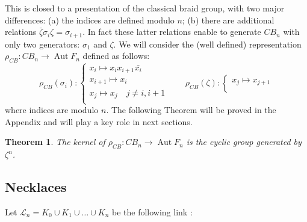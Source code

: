 \documentclass[11pt]{amsart}
\newtheorem{theorem}{Theorem}
\begin{document}
This is closed to a presentation of the classical braid group, with two major differences:
(a) the indices are defined modulo $n$; (b) there are additional relations ${\bar{{\zeta}}} \sigma_i \zeta =\sigma_{i+1}$.
In fact these latter relations enable to generate $CB_n$
with only two generators: $\sigma_1$ and $\zeta$.
We will consider the (well defined) representation $\rho_{CB}:  CB_n \to {\mathop{\mathrm{Aut}}\nolimits} F_n$   defined as follows: 
$$\rho_{CB}(\sigma_i) : 
\left\{\begin{array}{l}
x_i \mapsto x_{i} x_{i+1} {\bar{{x_{i}}}} \\
x_{i+1} \mapsto x_i \\
x_{j} \mapsto x_j \quad j \neq i,i+1\\
\end{array}\right.
\qquad 
\rho_{CB}(\zeta) : 
\left\{\begin{array}{l}
x_j \mapsto x_{j+1} \\      
\end{array}\right.$$
where indices are modulo $n$.
The following Theorem will be proved in the Appendix and will play a key role in next sections.

\begin{theorem} \label{thmCB}
The kernel of $\rho_{CB}:  CB_n \to {\mathop{\mathrm{Aut}}\nolimits} F_n$ is the cyclic group generated by $\zeta^n$.
\end{theorem}

\subsection{Necklaces} Let $\mathcal{L}_n = K_0 \cup K_1 \cup  \ldots\cup K_n$ be the following link : 
\end{document}
